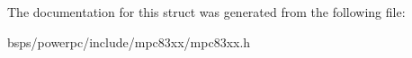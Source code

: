 The documentation for this struct was generated from the following file\+:\begin{DoxyCompactItemize}
\item 
bsps/powerpc/include/mpc83xx/mpc83xx.\+h\end{DoxyCompactItemize}

